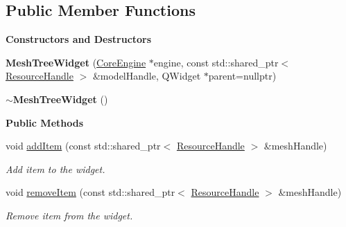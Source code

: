 \subsection*{Public Member Functions}
\begin{Indent}\textbf{ Constructors and Destructors}\par
\begin{DoxyCompactItemize}
\item 
\mbox{\label{classrev_1_1_view_1_1_mesh_tree_widget_aa1ae088e0b3d44afb53ac4a9a7866b4a}} 
{\bfseries Mesh\+Tree\+Widget} (\mbox{\hyperlink{classrev_1_1_core_engine}{Core\+Engine}} $\ast$engine, const std\+::shared\+\_\+ptr$<$ \mbox{\hyperlink{classrev_1_1_resource_handle}{Resource\+Handle}} $>$ \&model\+Handle, Q\+Widget $\ast$parent=nullptr)
\item 
\mbox{\label{classrev_1_1_view_1_1_mesh_tree_widget_adbff562ccf72984b99e7227bb498726f}} 
{\bfseries $\sim$\+Mesh\+Tree\+Widget} ()
\end{DoxyCompactItemize}
\end{Indent}
\begin{Indent}\textbf{ Public Methods}\par
\begin{DoxyCompactItemize}
\item 
\mbox{\label{classrev_1_1_view_1_1_mesh_tree_widget_ac9291c25df31bf56f471e0f8ebac8e24}} 
void \mbox{\hyperlink{classrev_1_1_view_1_1_mesh_tree_widget_ac9291c25df31bf56f471e0f8ebac8e24}{add\+Item}} (const std\+::shared\+\_\+ptr$<$ \mbox{\hyperlink{classrev_1_1_resource_handle}{Resource\+Handle}} $>$ \&mesh\+Handle)
\begin{DoxyCompactList}\small\item\em Add item to the widget. \end{DoxyCompactList}\item 
\mbox{\label{classrev_1_1_view_1_1_mesh_tree_widget_a2e0658f9827dff9dd648bc2ccabc04a1}} 
void \mbox{\hyperlink{classrev_1_1_view_1_1_mesh_tree_widget_a2e0658f9827dff9dd648bc2ccabc04a1}{remove\+Item}} (const std\+::shared\+\_\+ptr$<$ \mbox{\hyperlink{classrev_1_1_resource_handle}{Resource\+Handle}} $>$ \&mesh\+Handle)
\begin{DoxyCompactList}\small\item\em Remove item from the widget. \end{DoxyCompactList}\end{DoxyCompactItemize}
\end{Indent}

